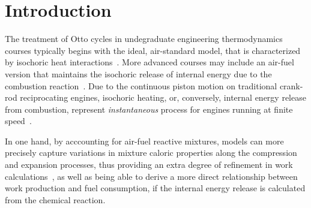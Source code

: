 
\section{Introduction}

    The treatment of  Otto  cycles  in  undegraduate  engineering  thermodynamics  courses  typically  begins  with  the  ideal,
    air-standard  model,  that  is  characterized   by   isochoric   heat   interactions~\cite{2014-CengelYA+BolesMA-McGrawHill,
    2002-MoranMJ+ShapiroHN-LTC, 1985-WylenG-Wiley, 2015-KroosKA+PotterMC-Cengage}. More advanced courses may include an air-fuel
    version    that    maintains    the    isochoric    release    of    internal    energy    due     to     the     combustion
    reaction~\cite{2012-BrunettiF-Blucher}. Due to the continuous piston motion on traditional crank-rod reciprocating  engines,
    isochoric heating, or, conversely, internal energy release  from  combustion,  represent  \emph{instantaneous}  process  for
    engines running at finite speed~\cite{2017-NaaktgeborenC-IntJMechEngEduc}.

    In one hand, by acccounting for air-fuel reactive mixtures, models can more precisely capture variations in mixture  caloric
    properties along  the  compression  and  expansion  processes,  thus  providing  an  extra  degree  of  refinement  in  work
    calculations~\cite{2012-BrunettiF-Blucher}, as well as being  able  to  derive  a  more  direct  relationship  between  work
    production and fuel consumption, if the internal energy release is calculated from the chemical reaction.



